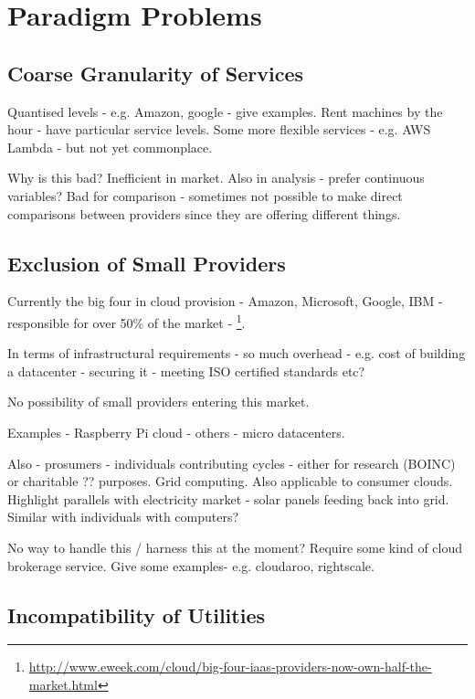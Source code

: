 \documentclass[conference,10pt]{IEEEtran}
\begin{document}

\section{Paradigm Problems}


\subsection{Coarse Granularity of Services}

Quantised levels - e.g. Amazon, google - give examples. Rent machines by the hour - have particular service levels. Some more flexible services - e.g. AWS Lambda - but not yet commonplace.

Why is this bad? Inefficient in market. Also in analysis - prefer continuous variables? Bad for comparison - sometimes not possible to make direct comparisons between providers since they are offering different things.


\subsection{Exclusion of Small Providers}

Currently the big four in cloud provision - Amazon, Microsoft, Google, IBM - responsible for over 50\% of the market - \footnote{\url{http://www.eweek.com/cloud/big-four-iaas-providers-now-own-half-the-market.html}}.

In terms of infrastructural requirements - so much overhead - e.g. cost of building a datacenter - securing it - meeting ISO certified standards etc?

No possibility of small providers entering this market. 

Examples - Raspberry Pi cloud - others - micro datacenters.


Also - prosumers - individuals contributing cycles - either for research (BOINC) or charitable ?? purposes. Grid computing. Also applicable to consumer clouds. Highlight parallels with electricity market - solar panels feeding back into grid. Similar with individuals with computers?

No way to handle this / harness this at the moment?
Require some kind of cloud brokerage service.
Give some examples- e.g. cloudaroo, rightscale.


\subsection{Incompatibility of Utilities}
\end{document}
